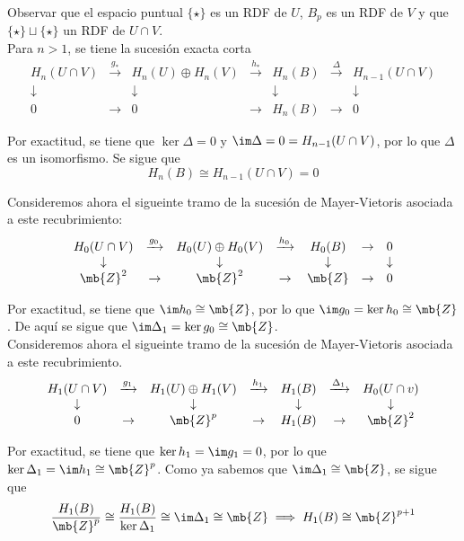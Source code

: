 Observar que el espacio puntual $\{\star\}$ es un RDF de $U$, $B_p$ es un RDF de $V$ y que $\{\star\}\sqcup\{\star\}$ un RDF de $U\cap V$.
\\

Para $n > 1$, se tiene la sucesión exacta corta
\[\begin{array}{ccccccc}
H_n(U \cap V)	&\xrightarrow{g_*}	&H_n(U)\oplus H_n(V)	&\xrightarrow{h_*}	&H_n(B)		&\xrightarrow{\Delta}&H_{n-1}(U \cap V)\\
\downarrow		&					&\downarrow			&					&\downarrow	&					&\downarrow\\
0		&\rightarrow			&0			&\rightarrow			&H_n(B)		&\rightarrow			&0
\end{array}\]

Por exactitud, se tiene que $\ker \Delta=0$ y $\im \Delta=0=H_{n-1}(U\cap V)$, por lo que $\Delta$ es un isomorfismo. Se sigue que $$H_n(B) \cong H_{n-1}(U\cap V)=0$$

Consideremos ahora el sigueinte tramo de la sucesión de Mayer-Vietoris asociada a este recubrimiento:
\[\begin{array}{ccccccc}
H_0(U \cap V)	&\xrightarrow{g_0}	&H_0(U)\oplus H_0(V)	&\xrightarrow{h_0}	&H_0(B)		&\rightarrow&0\\
\downarrow		&					&\downarrow			&					&\downarrow	&					&\downarrow\\
\mb{Z}^2		&\rightarrow			&\mb{Z}^2			&\rightarrow			&\mb{Z}		&\rightarrow			&0
\end{array}\]

Por exactitud, se tiene que $\im h_0 \cong \mb{Z}$, por lo que $\im g_0=\ker h_0 \cong \mb{Z}$. De aquí se sigue que $\im \Delta_1=\ker g_0 \cong \mb{Z}$.
\\

Consideremos ahora el sigueinte tramo de la sucesión de Mayer-Vietoris asociada a este recubrimiento.
\[\begin{array}{ccccccc}
H_1(U \cap V)	&\xrightarrow{g_1}	&H_1(U)\oplus H_1(V)	&\xrightarrow{h_1}	&H_1(B)		&\xrightarrow{\Delta_1}&H_0(U \cap v)\\
\downarrow		&					&\downarrow			&					&\downarrow	&					&\downarrow\\
0		&\rightarrow			&\mb{Z}^p			&\rightarrow			&	H_1(B)	&\rightarrow			&\mb{Z}^2
\end{array}\]

Por exactitud, se tiene que $\ker h_1=\im g_1=0$, por lo que $\ker \Delta_1=\im h_1\cong \mb{Z}^p$. Como ya sabemos que $\im \Delta_1 \cong \mb{Z}$, se sigue que $$\frac{H_1(B)}{\mb{Z}^p} \cong \frac{H_1(B)}{\ker \Delta_1} \cong \im \Delta_1 \cong \mb{Z} \implies H_1(B)\cong \mb{Z}^{p+1}$$

